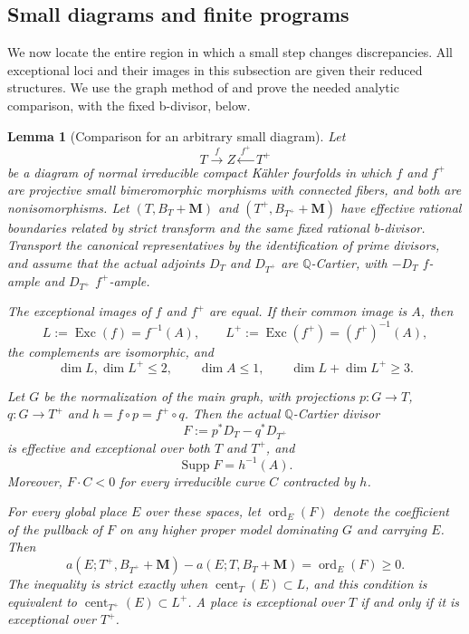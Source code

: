 \documentclass[11pt]{amsart}
\newtheorem{lemma}[theorem]{Lemma}
\theoremstyle{definition}
\theoremstyle{remark}
\numberwithin{equation}{section}
\newcommand{\Q}{\mathbb{Q}}
\newcommand{\M}{\mathbf{M}}
\DeclareMathOperator{\Exc}{Exc}
\DeclareMathOperator{\Supp}{Supp}
\DeclareMathOperator{\cent}{cent}
\DeclareMathOperator{\ord}{ord}
\begin{document}
\subsection{Small diagrams and finite programs}

We now locate the entire region in which a small step changes
discrepancies.  All exceptional loci and their images in this
subsection are given their reduced structures.  We use the graph method
of \cite[Lemma~2.1]{ProjectiveLCFourfolds} and prove the needed analytic
comparison, with the fixed b-divisor, below.

\begin{lemma}[Comparison for an arbitrary small diagram]
\label{lem:small-comparison}
Let
\[
 T\xrightarrow{\ f\ }Z\xleftarrow{\ f^+\ }T^+
\]
be a diagram of normal irreducible compact K\"ahler fourfolds in which
$f$ and $f^+$ are projective small bimeromorphic morphisms with
connected fibers, and both are nonisomorphisms.  Let $(T,B_T+\M)$ and
$(T^+,B_{T^+}+\M)$ have effective rational boundaries related by
strict transform and the same fixed rational b-divisor.  Transport the
canonical representatives by the identification of prime divisors,
and assume that the actual adjoints $D_T$ and $D_{T^+}$ are
$\Q$-Cartier, with $-D_T$ $f$-ample and $D_{T^+}$ $f^+$-ample.

The exceptional images of $f$ and $f^+$ are equal.  If their common
image is $A$, then
\begin{equation}\label{eq:small-loci}
 L:=\Exc(f)=f^{-1}(A),\qquad
 L^+:=\Exc(f^+)=(f^+)^{-1}(A),
\end{equation}
the complements are isomorphic, and
\begin{equation}\label{eq:small-dimensions}
 \dim L,\dim L^+\leq2,\qquad \dim A\leq1,
 \qquad \dim L+\dim L^+\geq3.
\end{equation}

Let $G$ be the normalization of the main graph, with projections
$p:G\to T$, $q:G\to T^+$ and $h=f\circ p=f^+\circ q$.  Then the
actual $\Q$-Cartier divisor
\begin{equation}\label{eq:small-divisor}
 F:=p^*D_T-q^*D_{T^+}
\end{equation}
is effective and exceptional over both $T$ and $T^+$, and
\begin{equation}\label{eq:small-support}
 \Supp F=h^{-1}(A).
\end{equation}
Moreover, $F\cdot C<0$ for every irreducible curve $C$ contracted by $h$.

For every global place $E$ over these spaces, let $\ord_E(F)$ denote
the coefficient of the pullback of $F$ on any higher proper model
dominating $G$ and carrying $E$.  Then
\begin{equation}\label{eq:small-discrepancies}
 a(E;T^+,B_{T^+}+\M)-a(E;T,B_T+\M)=\ord_E(F)\geq0.
\end{equation}
The inequality is strict exactly when $\cent_T(E)\subset L$, and this
condition is equivalent to $\cent_{T^+}(E)\subset L^+$.  A place is
exceptional over $T$ if and only if it is exceptional over $T^+$.
\end{lemma}
\end{document}
